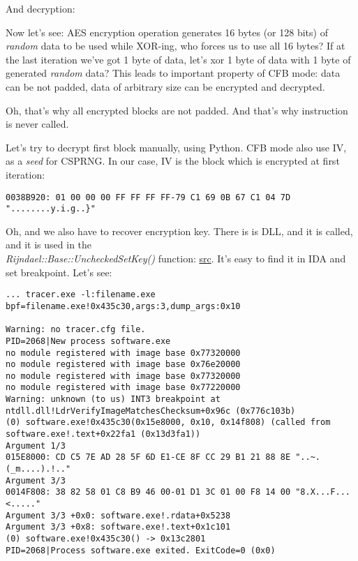 \begin{figure}[H]
\centering
{}
\end{figure}

And decryption:

\begin{figure}[H]
\centering
{}
\label{fig:CFB_decryption}
\end{figure}

Now let's see: AES encryption operation generates 16 bytes (or 128 bits) of \emph{random} data
to be used while XOR-ing, who forces us to use all 16 bytes?
If at the last iteration we've got 1 byte of data, let's xor 1 byte of data with 1 byte of generated
\emph{random} data?
This leads to important property of \ac{CFB} mode: data can be not padded, data of arbitrary size
can be encrypted and decrypted.

Oh, that's why all encrypted blocks are not padded.
And that's why  instruction is never called.

Let's try to decrypt first block manually, using Python.
\ac{CFB} mode also use \ac{IV}, as a \emph{seed} for \ac{CSPRNG}.
In our case, \ac{IV} is the block which is encrypted at first iteration:

\begin{lstlisting}
0038B920: 01 00 00 00 FF FF FF FF-79 C1 69 0B 67 C1 04 7D "........y.i.g..}"
\end{lstlisting}

Oh, and we also have to recover encryption key.
There is  is DLL, and it is called, and it is used in the \\
\emph{Rijndael::Base::UncheckedSetKey()} function:
\href{https://github.com/mmoss/cryptopp/blob/2772f7b57182b31a41659b48d5f35a7b6cedd34d/src/rijndael.cpp#L198}{src}.
It's easy to find it in IDA and set breakpoint. Let's see:

\begin{lstlisting}
... tracer.exe -l:filename.exe bpf=filename.exe!0x435c30,args:3,dump_args:0x10

Warning: no tracer.cfg file.
PID=2068|New process software.exe
no module registered with image base 0x77320000
no module registered with image base 0x76e20000
no module registered with image base 0x77320000
no module registered with image base 0x77220000
Warning: unknown (to us) INT3 breakpoint at ntdll.dll!LdrVerifyImageMatchesChecksum+0x96c (0x776c103b)
(0) software.exe!0x435c30(0x15e8000, 0x10, 0x14f808) (called from software.exe!.text+0x22fa1 (0x13d3fa1))
Argument 1/3
015E8000: CD C5 7E AD 28 5F 6D E1-CE 8F CC 29 B1 21 88 8E "..~.(_m....).!.."
Argument 3/3
0014F808: 38 82 58 01 C8 B9 46 00-01 D1 3C 01 00 F8 14 00 "8.X...F...<....."
Argument 3/3 +0x0: software.exe!.rdata+0x5238
Argument 3/3 +0x8: software.exe!.text+0x1c101
(0) software.exe!0x435c30() -> 0x13c2801
PID=2068|Process software.exe exited. ExitCode=0 (0x0)
\end{lstlisting}

